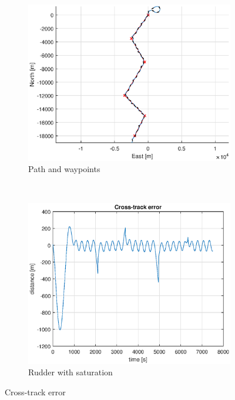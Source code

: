 \begin{figure}[ht]
	\begin{subfigure}[b]{0.4\textwidth}
		\includegraphics[width=\textwidth]{path_2_6}
		\caption{Path and waypoints}
		\label{fig:path_2_6}
	\end{subfigure}%
        ~
	\begin{subfigure}[b]{0.4\textwidth}
		\includegraphics[width=\textwidth]{cross_track_error2_6}
		\caption{Rudder with saturation}
		\label{fig:cross_track_error2_6}
	\end{subfigure}
	\caption{Cross-track error}
	\label{fig:task2_6}
\end{figure}

